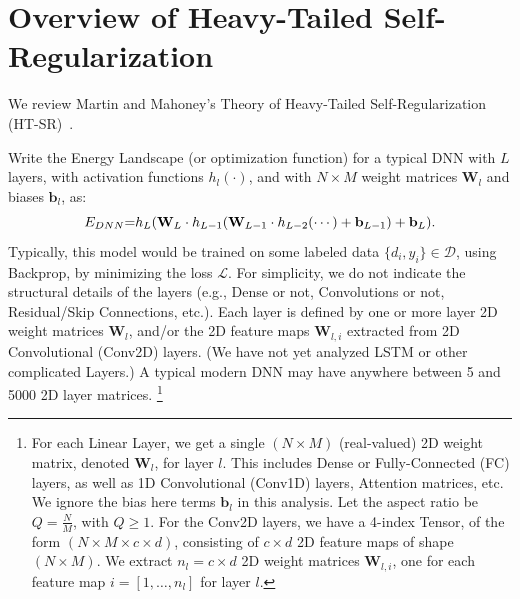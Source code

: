 
\vspace{-2mm}

\section{Overview of Heavy-Tailed Self-Regularization}
\label{sxn:theory-review}

\vspace{-1mm}

We review Martin and Mahoney's Theory of Heavy-Tailed Self-Regularization (HT-SR)~\cite{MM18_TR}.

Write the Energy Landscape (or optimization function) for a typical DNN with $L$ layers, with activation functions $h_{l}(\cdot)$, and with $N\times M$ weight matrices $\mathbf{W}_{l}$ and biases $\mathbf{b}_{l}$, as:
\begin{equation*}
E_{DNN} \hspace{-1mm} = \hspace{-1mm} h_{L}(\mathbf{W}_{L}\cdot h_{L-1}(\mathbf{W}_{L-1}\cdot h_{L-2}(\cdots)+\mathbf{b}_{L-1})+\mathbf{b}_{L})  .
\end{equation*}
Typically, this model would be trained on some labeled data $\{d_{i},y_{i}\}\in\mathcal{D}$, using Backprop, by minimizing the loss $\mathcal{L}$.
For simplicity, we do not indicate the structural details of the layers (e.g., Dense or not, Convolutions or not, Residual/Skip Connections, etc.). 
Each layer is defined by one or more layer 2D weight matrices $\mathbf{W}_{l}$, and/or the 2D feature maps $\mathbf{W}_{l,i}$ extracted from 2D Convolutional (Conv2D) layers.
(We have not yet analyzed LSTM or other complicated Layers.) 
A typical modern DNN may have anywhere between 5 and 5000 2D layer matrices.%
\footnote{%
For each Linear Layer, we get a  single $(N\times M)$ (real-valued) 2D weight matrix, denoted $\mathbf{W}_{l}$, for layer $l$.  
This includes Dense or Fully-Connected (FC) layers, as well as 1D Convolutional (Conv1D) layers, Attention matrices, etc.
We ignore the bias here terms $\mathbf{b}_{l}$ in this analysis. 
Let the aspect ratio be $Q=\frac{N}{M}$, with $Q\ge 1$.
For the Conv2D layers, we have a 4-index Tensor, of the form $(N\times M \times c\times d)$, consisting
of $c\times d$ 2D feature maps of shape $(N\times M)$.    
We  extract $n_{l}=c\times d$ 2D weight matrices $\mathbf{W}_{l,i}$, one for each feature map $i=[1,\dots,n_{l}]$ for layer $l$.
}
   

